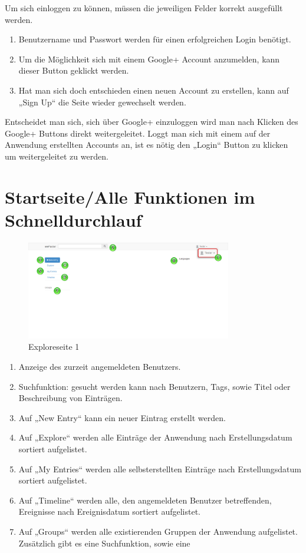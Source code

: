 Um sich einloggen zu können, müssen die jeweiligen Felder korrekt ausgefüllt werden. 
\begin{enumerate}
\item Benutzername und Passwort werden für einen erfolgreichen Login benötigt.
\item Um die Möglichkeit sich mit einem Google+ Account anzumelden, kann dieser Button geklickt werden.
\item Hat man sich doch entschieden einen neuen Account zu erstellen, kann auf „Sign Up“ die Seite wieder gewechselt werden.
\end{enumerate}


Entscheidet man sich, sich über Google+ einzuloggen wird man nach Klicken des Google+ Buttons direkt weitergeleitet.
Loggt man sich mit einem auf der Anwendung erstellten Accounts an, ist es nötig den „Login“ Button zu klicken um weitergeleitet zu werden.


\chapter{Startseite/Alle Funktionen im Schnelldurchlauf}

\begin{figure}[H]
    \centering
    \includegraphics[width=0.8\textwidth]{Bilder/6.png}
    \caption{Exploreseite 1 }
    \label{fig:exploreseite1 }
\end{figure}



\begin{enumerate}
\item Anzeige des zurzeit angemeldeten Benutzers.
\item Suchfunktion: gesucht werden kann nach Benutzern, Tags, sowie Titel oder Beschreibung von Einträgen.
\item Auf „New Entry“ kann ein neuer Eintrag erstellt werden.
\item Auf „Explore“ werden alle Einträge der Anwendung nach Erstellungsdatum sortiert aufgelistet.
\item Auf „My Entries“ werden alle selbsterstellten Einträge nach Erstellungsdatum sortiert aufgelistet.
\item Auf „Timeline“ werden alle, den angemeldeten Benutzer betreffenden, Ereignisse nach Ereignisdatum sortiert aufgelistet.
\item Auf „Groups“ werden alle existierenden Gruppen der Anwendung aufgelistet. Zusätzlich gibt es eine Suchfunktion, sowie eine
\end{enumerate}

